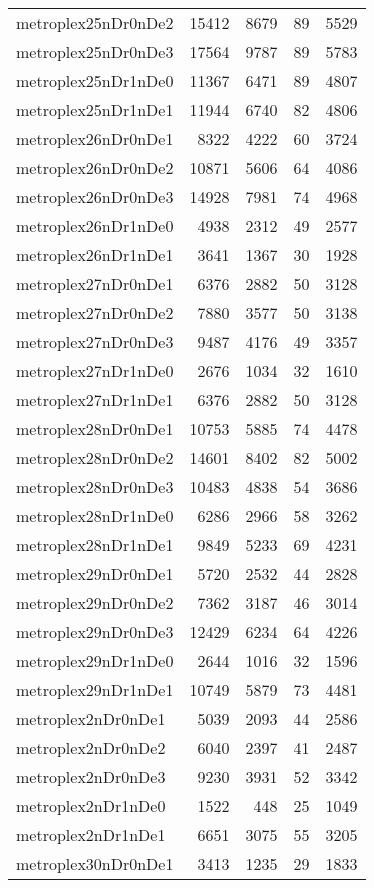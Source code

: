 \begin{longtable}{lrrrr}
metroplex25nDr0nDe2 & 15412 & 8679 & 89 & 5529 \\
metroplex25nDr0nDe3 & 17564 & 9787 & 89 & 5783 \\
metroplex25nDr1nDe0 & 11367 & 6471 & 89 & 4807 \\
metroplex25nDr1nDe1 & 11944 & 6740 & 82 & 4806 \\
metroplex26nDr0nDe1 & 8322 & 4222 & 60 & 3724 \\
metroplex26nDr0nDe2 & 10871 & 5606 & 64 & 4086 \\
metroplex26nDr0nDe3 & 14928 & 7981 & 74 & 4968 \\
metroplex26nDr1nDe0 & 4938 & 2312 & 49 & 2577 \\
metroplex26nDr1nDe1 & 3641 & 1367 & 30 & 1928 \\
metroplex27nDr0nDe1 & 6376 & 2882 & 50 & 3128 \\
metroplex27nDr0nDe2 & 7880 & 3577 & 50 & 3138 \\
metroplex27nDr0nDe3 & 9487 & 4176 & 49 & 3357 \\
metroplex27nDr1nDe0 & 2676 & 1034 & 32 & 1610 \\
metroplex27nDr1nDe1 & 6376 & 2882 & 50 & 3128 \\
metroplex28nDr0nDe1 & 10753 & 5885 & 74 & 4478 \\
metroplex28nDr0nDe2 & 14601 & 8402 & 82 & 5002 \\
metroplex28nDr0nDe3 & 10483 & 4838 & 54 & 3686 \\
metroplex28nDr1nDe0 & 6286 & 2966 & 58 & 3262 \\
metroplex28nDr1nDe1 & 9849 & 5233 & 69 & 4231 \\
metroplex29nDr0nDe1 & 5720 & 2532 & 44 & 2828 \\
metroplex29nDr0nDe2 & 7362 & 3187 & 46 & 3014 \\
metroplex29nDr0nDe3 & 12429 & 6234 & 64 & 4226 \\
metroplex29nDr1nDe0 & 2644 & 1016 & 32 & 1596 \\
metroplex29nDr1nDe1 & 10749 & 5879 & 73 & 4481 \\
metroplex2nDr0nDe1 & 5039 & 2093 & 44 & 2586 \\
metroplex2nDr0nDe2 & 6040 & 2397 & 41 & 2487 \\
metroplex2nDr0nDe3 & 9230 & 3931 & 52 & 3342 \\
metroplex2nDr1nDe0 & 1522 & 448 & 25 & 1049 \\
metroplex2nDr1nDe1 & 6651 & 3075 & 55 & 3205 \\
metroplex30nDr0nDe1 & 3413 & 1235 & 29 & 1833 \\

\end{longtable}
